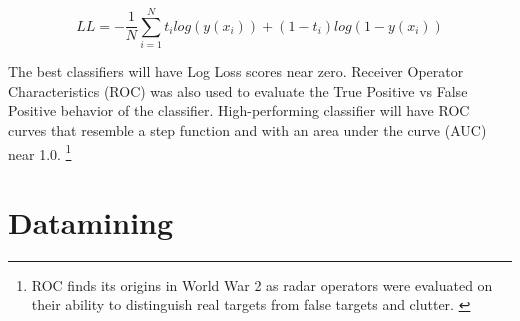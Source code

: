 \documentclass[fleqn,10pt]{SelfArx} %
\begin{document}
$$LL = - \frac{1}{N} \sum_{i=1}^N t_i log(y(x_i)) + (1-t_i) log(1-y(x_i))$$

The best classifiers will have Log Loss scores near zero. Receiver Operator Characteristics (ROC) was also used to evaluate the True Positive vs False Positive behavior of the classifier.  High-performing classifier will have ROC curves that resemble a step function and with an area under the curve (AUC) near 1.0.  \footnote{ROC finds its origins in World War 2 as radar operators were evaluated on their ability to distinguish real targets from false targets and clutter. \cite{Lusted1217}}


\section{Datamining}
\end{document}
